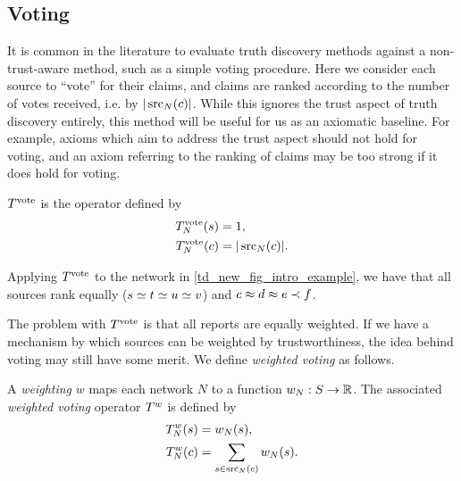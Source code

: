 \subsection{Voting}
\label{td_new_sec_voting}

It is common in the literature to evaluate truth discovery methods against a
non-trust-aware method, such as a simple voting procedure.\footnotemark{} Here
we consider each source to ``vote'' for their claims, and claims are ranked
according to the number of votes received, i.e. by $|\operatorname{src}_N(c)|$. While this
ignores the trust aspect of truth discovery entirely, this method will be
useful for us as an axiomatic baseline. For example, axioms which aim to
address the trust aspect should not hold for voting, and an axiom referring to
the ranking of claims may be too strong if it does hold for voting.


\begin{definition}
    $T^{\operatorname{vote}}$ is the operator defined by
    \begin{align*}
        T^{\operatorname{vote}}_N(s) &= 1,\\
        T^{\operatorname{vote}}_N(c) &= |\operatorname{src}_N(c)|.
    \end{align*}
\end{definition}

Applying $T^{\operatorname{vote}}{}$ to the network in \cref{td_new_fig_intro_example}, we have
that all sources rank equally ($s \simeq t \simeq u \simeq v$) and $c \approx d \approx e
\prec f$.

The problem with $T^{\operatorname{vote}}{}$ is that all reports are equally weighted. If we
have a mechanism by which sources can be weighted by trustworthiness, the idea
behind voting may still have some merit. We define \emph{weighted voting} as
follows.

\begin{definition}
    A \emph{weighting} $w$ maps each network $N$ to a function $w_N: S \to \mathbb{R}$.
    The associated \emph{weighted voting} operator $T^{w}$ is defined by
    \begin{align*}
        T^{w}_N(s) &= w_N(s), \\
        T^{w}_N(c) &= \sum_{s \in \operatorname{src}_N(c)}{w_N(s)}.
    \end{align*}
\end{definition}

